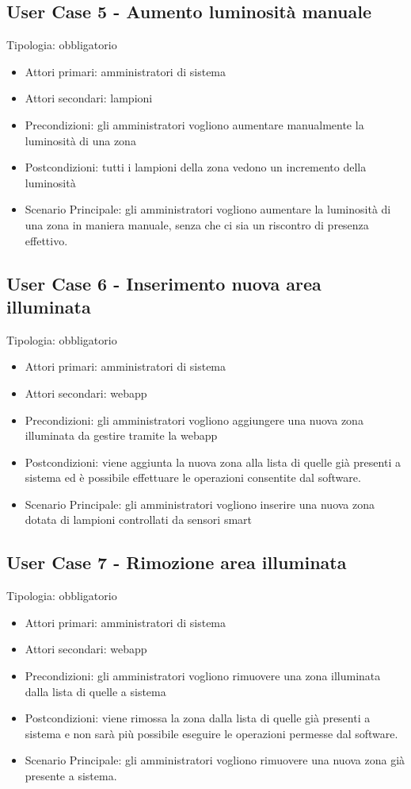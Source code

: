 \documentclass[12pt]{article}
\begin{document}
\subsection{User Case 5 - Aumento luminosità manuale}
Tipologia: obbligatorio
\begin{itemize}
	\item Attori primari: amministratori di sistema
	\item Attori secondari: lampioni
	\item Precondizioni: gli amministratori vogliono aumentare manualmente la luminosità di una zona
	\item Postcondizioni: tutti i lampioni della zona vedono un incremento della luminosità
	\item Scenario Principale: gli amministratori vogliono aumentare la luminosità di una zona in maniera manuale, senza che ci sia un riscontro di presenza effettivo.
\end{itemize}

\subsection{User Case 6 - Inserimento nuova area illuminata}
Tipologia: obbligatorio
\begin{itemize}
	\item Attori primari: amministratori di sistema
	\item Attori secondari: webapp
	\item Precondizioni: gli amministratori vogliono aggiungere una nuova zona illuminata da gestire tramite la webapp
	\item Postcondizioni: viene aggiunta la nuova zona alla lista di quelle già presenti a sistema ed è possibile effettuare le operazioni consentite dal software.
	\item Scenario Principale: gli amministratori vogliono inserire una nuova zona dotata di lampioni controllati da sensori smart 
\end{itemize}

\subsection{User Case 7 - Rimozione area illuminata}
Tipologia: obbligatorio
\begin{itemize}
	\item Attori primari: amministratori di sistema
	\item Attori secondari: webapp
	\item Precondizioni: gli amministratori vogliono rimuovere una  zona illuminata dalla lista di quelle a sistema
	\item Postcondizioni: viene rimossa la zona dalla lista di quelle già presenti a sistema e non sarà più possibile eseguire le operazioni permesse dal software.
	\item Scenario Principale: gli amministratori vogliono rimuovere una nuova zona già presente a sistema.
\end{itemize}
\end{document}
